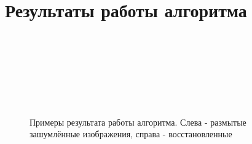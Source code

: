 \newpage
\section{Результаты работы алгоритма}

\begin{figure}[H]
\begin{minipage}[t]{0.45\linewidth}
\\ 
\end{minipage}
\hfill
\begin{minipage}[t]{0.45\linewidth}
\\
\end{minipage}
    \vfill
\begin{minipage}[t]{0.45\linewidth}
\\ 
\end{minipage}
\hfill
\begin{minipage}[t]{0.45\linewidth}
\\
\end{minipage}


\caption{ Примеры результата работы алгоритма. Слева - размытые зашумлённые изображения, справа - восстановленные }
\label{ris:restore_example}
\end{figure}



